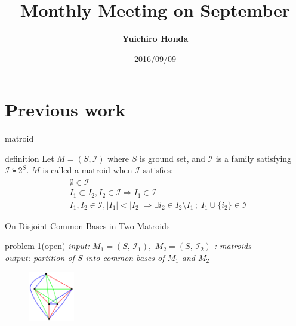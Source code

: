 \documentclass[11pt,xcolor=dvipsnames,table,dvipdfmx]{beamer}
\title{Monthly Meeting on September}
\author{\textbf{Yuichiro Honda}}
\date{2016/09/09}
\institute{Morita lab. M1}
\begin{document}
\maketitle


\section{Previous work}
\begin{frame}{matroid}
 \begin{block}{definition}
  Let $M = (S, \mathcal{I})$ where $S$ is ground set, and $\mathcal{I}$ is a family satisfying $\mathcal{I} \subseteqq 2^S$. $M$ is called a \alert{matroid} when $\mathcal{I}$ satisfies:
  \begin{align}
   &\emptyset \in \mathcal{I} \\
   &I_1 \subset I_2 , I_2 \in \mathcal{I} \Rightarrow I_1 \in \mathcal{I} \\
   &I_1 , I_2 \in \mathcal{I} , |I_1| < |I_2| \Rightarrow \exists i_2 \in I_2 \setminus I_1 \, ; \; I_1 \cup \{i_2\} \in \mathcal{I}
  \end{align}
 \end{block}
\end{frame}


\begin{frame}{On Disjoint Common Bases in Two Matroids}
 \begin{alertblock}{problem 1(open)} \it
  input: $M_1 = (S,\,\mathcal{I}_1),\,\,M_2 = (S,\,\mathcal{I}_2)$ : matroids \\
  output: partition of $S$ into common bases of $M_1$ and $M_2$ \\
  \begin{figure}
   \centering
   \includegraphics[width=2cm]{partitioned-graph.png}
  \end{figure}
 \end{alertblock}
 \vspace{0.5cm}
\end{frame}
\end{document}
